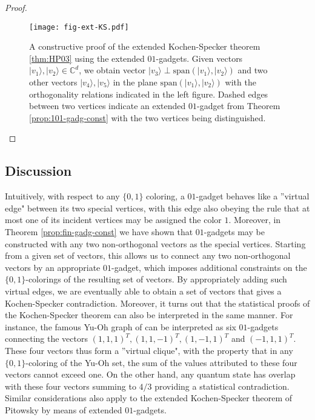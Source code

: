 \documentclass[twocolumn, a4paper, superscriptaddress,nofootinbib, accepted=2020-08-07, hyperref]{quantumarticle}
\begin{document}
\begin{proof}
\begin{figure}
	\centerline{\texttt{[image: fig-ext-KS.pdf]}}
	\caption{A constructive proof of the extended Kochen-Specker theorem \ref{thm:HP03} using the extended $01$-gadgets. Given vectors $|v_1 \rangle, |v_2 \rangle \in \mathbb{C}^d$, we obtain vector $|v_3 \rangle \perp \text{span}(|v_1 \rangle, |v_2 \rangle)$ and two other vectors $|v_4 \rangle, |v_5 \rangle$ in the plane $\text{span}(|v_1 \rangle, |v_2 \rangle)$ with the orthogonality relations indicated in the left figure. Dashed edges between two vertices indicate an extended $01$-gadget from Theorem \ref{prop:101-gadg-const} with the two vertices being distinguished.}
	\label{fig:Ext-KS}
\end{figure} 
\end{proof}
\color{black}

\subsection{Discussion} Intuitively, with respect to any $\{0,1\}$ coloring, a $01$-gadget behaves like a ''virtual edge" between its two special vertices, with this edge also obeying the rule that at most one of its incident vertices may be assigned the color $1$. Moreover, in Theorem \ref{prop:fin-gadg-const} we have shown that $01$-gadgets may be constructed with any two non-orthogonal vectors as the special vertices. Starting from a given set of vectors, this allows us to connect any two non-orthogonal vectors by an appropriate $01$-gadget, which imposes additional constraints on the $\{0,1\}$-colorings of the resulting set of vectors. By appropriately adding such virtual edges, we are eventually able to obtain a set of vectors that gives a Kochen-Specker contradiction. Moreover, it turns out that the statistical proofs of the Kochen-Specker theorem can also be interpreted in the same manner. For instance, the famous Yu-Oh graph of \cite{YO12} can be interpreted as six $01$-gadgets connecting the vectors $(1,1,1)^T, (1,1,-1)^T, (1,-1,1)^T$ and $(-1,1,1)^T$. These four vectors thus form a ''virtual clique", with the property that in any $\{0,1\}$-coloring of the Yu-Oh set, the sum of the values attributed to these four vectors cannot exceed one. On the other hand, any quantum state has overlap with these four vectors summing to $4/3$ providing a statistical contradiction. Similar considerations also apply to the extended Kochen-Specker theorem of Pitowsky by means of extended $01$-gadgets.     
\end{document}
